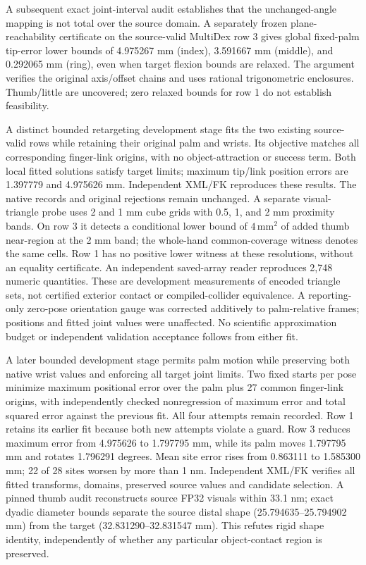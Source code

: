 \documentclass[10pt,letterpaper]{article}
\begin{document}
A subsequent exact joint-interval audit establishes that the unchanged-angle
mapping is not total over the source domain. A separately frozen plane-reachability
certificate on the source-valid MultiDex row 3 gives global fixed-palm tip-error
lower bounds of 4.975267 mm (index), 3.591667 mm (middle), and 0.292065 mm (ring),
even when target flexion bounds are relaxed. The argument verifies the original
axis/offset chains and uses rational trigonometric enclosures. Thumb/little are
uncovered; zero relaxed bounds for row 1 do not establish feasibility.

A distinct bounded retargeting development stage fits the two existing
source-valid rows while retaining their original palm and wrists. Its objective
matches all corresponding finger-link origins, with no object-attraction or
success term. Both local fitted solutions satisfy target limits; maximum tip/link
position errors are 1.397779 and 4.975626 mm. Independent XML/FK reproduces these
results. The native records and original rejections remain unchanged. A separate
visual-triangle probe uses 2 and 1 mm cube grids with 0.5, 1, and 2 mm proximity
bands. On row 3 it detects a conditional lower bound of $4\,\mathrm{mm}^2$ of added
thumb near-region at the 2 mm band; the whole-hand common-coverage witness denotes
the same cells. Row 1 has no positive lower witness at these resolutions, without
an equality certificate. An independent saved-array reader reproduces 2,748
numeric quantities. These are development measurements of encoded triangle sets,
not certified exterior contact or compiled-collider equivalence. A reporting-only
zero-pose orientation gauge was corrected additively to palm-relative frames;
positions and fitted joint values were unaffected. No scientific approximation
budget or independent validation acceptance follows from either fit.

A later bounded development stage permits palm motion while preserving both
native wrist values and enforcing all target joint limits. Two fixed starts per
pose minimize maximum positional error over the palm plus 27 common finger-link
origins, with independently checked nonregression of maximum error and total
squared error against the previous fit. All four attempts remain recorded. Row 1
retains its earlier fit because both new attempts violate a guard. Row 3 reduces
maximum error from 4.975626 to 1.797795 mm, while its palm moves 1.797795 mm and
rotates 1.796291 degrees. Mean site error rises from 0.863111 to 1.585300 mm;
22 of 28 sites worsen by more than 1 nm. Independent XML/FK verifies all fitted
transforms, domains, preserved source values and candidate selection. A pinned
thumb audit reconstructs source FP32 visuals within 33.1 nm; exact dyadic diameter
bounds separate the source distal shape (25.794635--25.794902 mm) from the target
(32.831290--32.831547 mm). This refutes rigid shape identity, independently of
whether any particular object-contact region is preserved.
\end{document}
